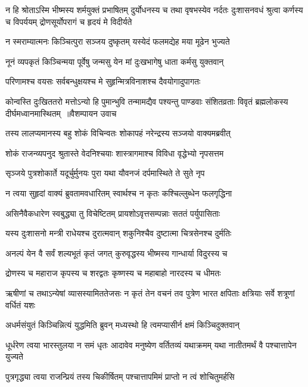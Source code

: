 न हि श्रोताऽस्मि भीष्मस्य शर्मयुक्तं प्रभाषितम्
\threelineshloka
{दुर्योधनस्य च तथा वृषभस्येव नर्दतः}
{दुःशासनवधं श्रुत्वा कर्णस्य च विपर्ययम्}
{द्रोणसूर्योपरागं च हृदयं मे विदीर्यते}


\twolineshloka
{न स्मराम्यात्मनः किञ्चित्पुरा सञ्जय दुष्कृतम्}
{यस्येदं फलमद्येह मया मूढेन भुज्यते}


\twolineshloka
{नूनं व्यपकृतं किञ्चिन्मया पूर्वेषु जन्मसु}
{येन मां दुःखभागेषु धाता कर्मसु युक्तवान्}


\twolineshloka
{परिणामश्च वयसः सर्वबन्धुक्षयश्च मे}
{सुहृन्मित्रविनाशश्च दैवयोगादुपागतः}


कोन्वस्ति दुःखिततरो मत्तोऽन्यो हि पुमान्भुवि
\threelineshloka
{तन्मामद्यैव पश्यन्तु पाण्डवाः संशितव्रताः}
{विवृतं ब्रह्मलोकस्य दीर्घमध्वानमास्थितम् ॥वैशम्पायन उवाच}
{}


\twolineshloka
{तस्य लालप्यमानस्य बहु शोकं विचिन्वतः}
{शोकापहं नरेन्द्रस्य सञ्जयो वाक्यमब्रवीत्}


\twolineshloka
{शोकं राजन्व्यपनुद श्रुतास्ते वेदनिश्चयाः}
{शास्त्रागमाश्च विविधा वृद्धेभ्यो नृपसत्तम}


\twolineshloka
{सृञ्जये पुत्रशोकार्ते यदूर्चुर्मुनयः पुरा}
{यथा यौवनजं दर्पमास्थिते ते सुते नृप}


\twolineshloka
{न त्वया सुहृदां वाक्यं ब्रुवतामवधारितम्}
{स्वार्थश्च न कृतः कश्चिल्लुब्धेन फलगृद्धिना}


\twolineshloka
{असिनैवैकधारेण स्वबुद्ध्या तु विचेष्टितम्}
{प्रायशोऽवृत्तसम्पन्नाः सततं पर्युपासिताः}


\twolineshloka
{यस्य दुःशासनो मन्त्री राधेयश्च दुरात्मवान्}
{शकुनिश्चैव दुष्टात्मा चित्रसेनश्च दुर्मतिः}


\twolineshloka
{अनल्पं येन वै सर्वं शल्यभूतं कृतं जगत्}
{कुरुवृद्धस्य भीष्मस्य गान्धार्या विदुरस्य च}


\twolineshloka
{द्रोणस्य च महाराज कृपस्य च शरद्वतः}
{कृष्णस्य च महाबाहो नारदस्य च धीमतः}


\threelineshloka
{ऋषीणां च तथाऽन्येषां व्यासस्यामिततेजसः}
{न कृतं तेन वचनं तव पुत्रेण भारत}
{क्षपिताः क्षत्रियाः सर्वे शत्रूणां वर्धितं यशः}


\twolineshloka
{अधर्मसंयुतं किञ्चिन्नित्यं युद्धमिति ब्रुवन्}
{मध्यस्थो हि त्वमप्यासीर्न क्षमं किञ्चिदुक्तवान्}


धूर्धरेण त्वया भारस्तुलया न समं धृतः
\twolineshloka
{आदावेव मनुष्येण वर्तितव्यं यथाक्रमम्}
{यथा नातीतमर्थं वै पश्चात्तापेन युज्यते}


\twolineshloka
{पुत्रगृद्ध्या त्वया राजन्प्रियं तस्य चिकीर्षितम्}
{पश्चात्तापमिमं प्राप्तो न त्वं शोचितुमर्हसि}


